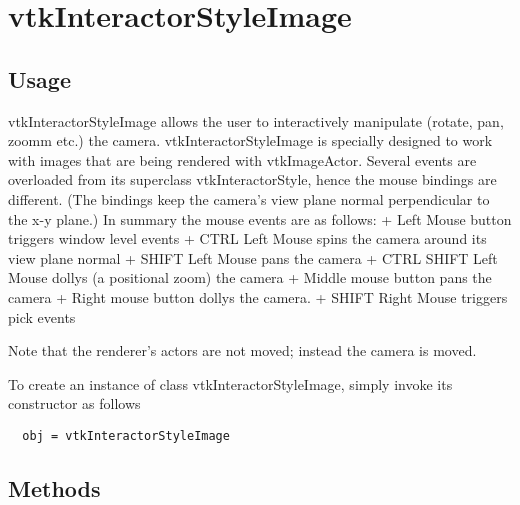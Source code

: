 \section{vtkInteractorStyleImage}

\subsection{Usage}

 vtkInteractorStyleImage allows the user to interactively manipulate
 (rotate, pan, zoomm etc.) the camera. vtkInteractorStyleImage is specially
 designed to work with images that are being rendered with
 vtkImageActor. Several events are overloaded from its superclass
 vtkInteractorStyle, hence the mouse bindings are different. (The bindings
 keep the camera's view plane normal perpendicular to the x-y plane.) In
 summary the mouse events are as follows:
 + Left Mouse button triggers window level events
 + CTRL Left Mouse spins the camera around its view plane normal
 + SHIFT Left Mouse pans the camera
 + CTRL SHIFT Left Mouse dollys (a positional zoom) the camera
 + Middle mouse button pans the camera
 + Right mouse button dollys the camera.
 + SHIFT Right Mouse triggers pick events

 Note that the renderer's actors are not moved; instead the camera is moved.

To create an instance of class vtkInteractorStyleImage, simply
invoke its constructor as follows
\begin{verbatim}
  obj = vtkInteractorStyleImage
\end{verbatim}
\subsection{Methods}

